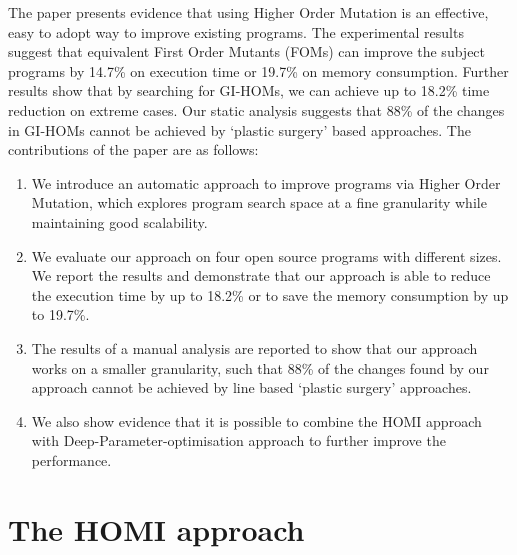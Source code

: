 \documentclass[oribibl]{llncs}
\begin{document}
The paper presents evidence that using Higher Order Mutation is an effective, easy to adopt way to improve existing programs. 
The experimental results suggest that equivalent First Order Mutants (FOMs) can improve the subject programs by 14.7\% on execution time or 19.7\% on memory consumption.
Further results show that by searching for GI-HOMs, we can achieve up to 18.2\% time reduction on extreme cases.
Our static analysis suggests that 88\% of the changes in GI-HOMs cannot be achieved by `plastic surgery' based approaches.
The contributions of the paper are as follows:
\begin{enumerate}
\item We introduce an automatic approach to improve programs via Higher Order Mutation, which explores program search space at a fine granularity while maintaining good scalability.
\item We evaluate our approach on four open source programs with different sizes. We report the results and demonstrate that our approach is able to reduce the execution time by up to 18.2\% or to save the memory consumption by up to 19.7\%.
\item The results of a manual analysis are reported to show that our approach works on a smaller granularity, such that 88\% of the changes found by our approach cannot be achieved by line based `plastic surgery' approaches.
\item We also show evidence that it is possible to combine the HOMI approach with Deep-Parameter-optimisation approach to further improve the performance. 

\end{enumerate}




\section{The HOMI approach}
\label{sec_method}
\end{document}
